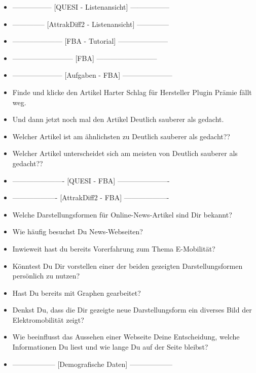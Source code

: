 {\begin{itemize}[]
        Wenn ich jedoch mehr dazu wüsste, könnte es sein, dass ich das jetzt nicht so auswählen würde.
        \item {-----------------} [QUESI - Listenansicht] {-----------------}
        \item {--------------} [AttrakDiff2 - Listenansicht] {--------------}
        \item {---------------------} [FBA - Tutorial] {---------------------}
        \item {--------------------------} [FBA] {--------------------------}
        \item {---------------------} [Aufgaben - FBA] {---------------------}
        \item {} Finde und klicke den Artikel \flqq Harter Schlag für Hersteller Plugin Prämie fällt weg\frqq{}.
        \item {} Und dann jetzt noch mal den Artikel \flqq Deutlich sauberer als gedacht\frqq{}.
        \item {} Welcher Artikel ist am ähnlichsten zu \flqq Deutlich sauberer als gedacht?\frqq{}?
        \item {} Welcher Artikel unterscheidet sich am meisten von \flqq Deutlich sauberer als gedacht?\frqq{}?
        \item {----------------------} [QUESI - FBA] {----------------------}
        \item {-------------------} [AttrakDiff2 - FBA] {-------------------}
        \item {} Welche Darstellungsformen für Online-News-Artikel sind Dir bekannt?
        \item {} Wie häufig besuchst Du News-Webseiten?
        \item {} Inwieweit hast du bereits Vorerfahrung zum Thema E-Mobilität?
        \item {} Könntest Du Dir vorstellen einer der beiden gezeigten Darstellungsformen persönlich zu nutzen?
        \item {} Hast Du bereits mit Graphen gearbeitet?
        \item {} Denkst Du, dass die Dir gezeigte neue Darstellungsform ein diverses Bild der Elektromobilität zeigt?
        \item {} Wie beeinflusst das Aussehen einer Webseite Deine Entscheidung, welche Informationen Du liest und wie lange Du auf der Seite bleibst?
        \item {------------------} [Demografische Daten] {------------------}
    \end{itemize}}
\nolinenumbers
